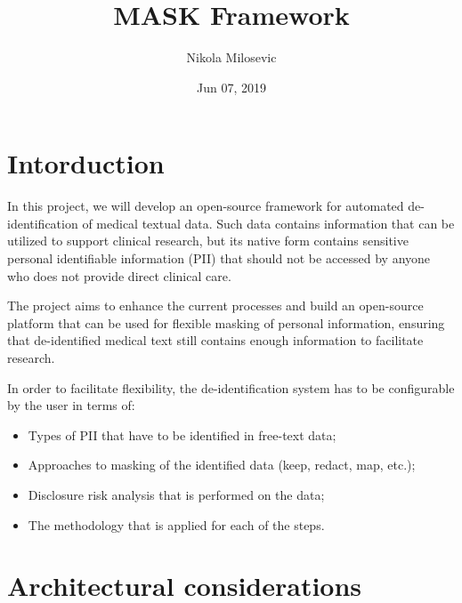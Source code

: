 \documentclass[letterpaper,10pt,english]{sphinxmanual}
\title{MASK Framework}
\date{Jun 07, 2019}
\author{Nikola Milosevic}
\begin{document}
\pagestyle{empty}
\sphinxmaketitle
\pagestyle{plain}
\sphinxtableofcontents
\pagestyle{normal}
\label{\detokenize{index::doc}}



\chapter{Intorduction}
\label{\detokenize{index:intorduction}}

In this project, we will develop an open-source framework for automated de-identification of medical textual data. Such data contains information that can be utilized to support clinical research, but its native form contains sensitive personal identifiable information (PII) that should not be accessed by anyone who does not provide direct clinical care.

The project aims to enhance the current processes and build an open-source platform that can be used for flexible masking of personal information, ensuring that de-identified medical text still contains enough information to facilitate research.

In order to facilitate flexibility, the de-identification system has to be configurable by the user in terms of:
\begin{itemize}
\item {} 
Types of PII that have to be identified in free-text data;

\item {} 
Approaches to masking of the identified data (keep, redact, map, etc.);

\item {} 
Disclosure risk analysis that is performed on the data;

\item {} 
The methodology that is applied for each of the steps.

\end{itemize}


\chapter{Architectural considerations}
\label{\detokenize{index:architectural-considerations}}
\end{document}
